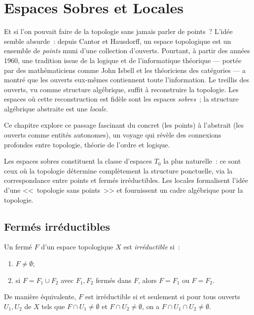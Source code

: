 \chapter{Espaces Sobres et Locales}
\label{ch:sobres_locales}

Et si l'on pouvait faire de la topologie sans jamais parler de points~? L'id\'ee semble absurde~: depuis Cantor et Hausdorff, un espace topologique est un ensemble de \emph{points} muni d'une collection d'ouverts. Pourtant, \`a partir des ann\'ees 1960, une tradition issue de la logique et de l'informatique th\'eorique --- port\'ee par des math\'ematiciens comme John Isbell et les th\'eoriciens des cat\'egories --- a montr\'e que les ouverts eux-m\^emes contiennent toute l'information. Le treillis des ouverts, vu comme structure alg\'ebrique, suffit \`a reconstruire la topologie. Les espaces o\`u cette reconstruction est fid\`ele sont les espaces \emph{sobres}~; la structure alg\'ebrique abstraite est une \emph{locale}.

Ce chapitre explore ce passage fascinant du concret (les points) \`a l'abstrait (les ouverts comme entit\'es autonomes), un voyage qui r\'ev\`ele des connexions profondes entre topologie, th\'eorie de l'ordre et logique.

\begin{intuition}
Les espaces sobres constituent la classe d'espaces $T_0$ la plus naturelle~: ce sont ceux
o\`u la topologie d\'etermine compl\`etement la structure ponctuelle, via la correspondance
entre points et ferm\'es irr\'eductibles. Les locales formalisent l'id\'ee d'une
<<~topologie sans points~>> et fournissent un cadre alg\'ebrique pour la topologie.
\end{intuition}

\section{Ferm\'es irr\'eductibles}

\begin{definition}
Un ferm\'e $F$ d'un espace topologique $X$ est \emph{irr\'eductible} si~:
\begin{enumerate}
  \item $F \neq \emptyset$;
  \item si $F = F_1 \cup F_2$ avec $F_1, F_2$ ferm\'es dans $F$, alors $F = F_1$ ou
    $F = F_2$.
\end{enumerate}
De mani\`ere \'equivalente, $F$ est irr\'eductible si et seulement si pour tous ouverts
$U_1, U_2$ de $X$ tels que $F \cap U_1 \neq \emptyset$ et $F \cap U_2 \neq \emptyset$,
on a $F \cap U_1 \cap U_2 \neq \emptyset$.
\end{definition}

